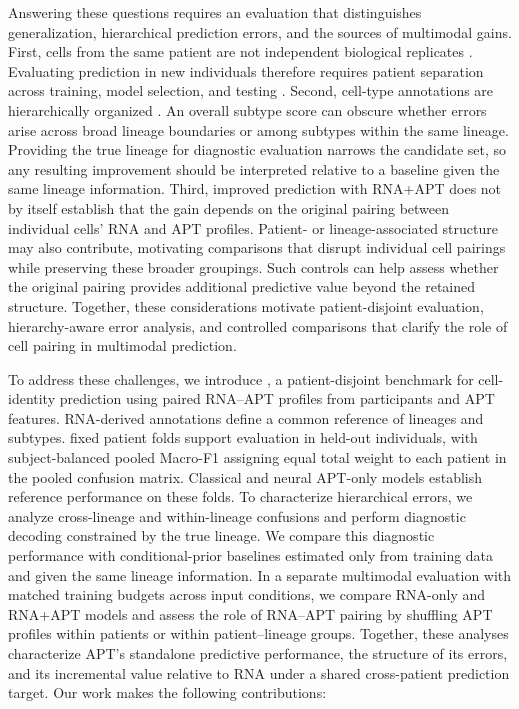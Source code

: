 Answering these questions requires an evaluation that distinguishes generalization, hierarchical prediction errors, and the sources of multimodal gains. First, cells from the same patient are not independent biological replicates \citep{zimmerman2021practical}. Evaluating prediction in new individuals therefore requires patient separation across training, model selection, and testing \citep{fischer2024sctab}. Second, cell-type annotations are hierarchically organized \citep{cultrera2026improving}. An overall subtype score can obscure whether errors arise across broad lineage boundaries or among subtypes within the same lineage. Providing the true lineage for diagnostic evaluation narrows the candidate set, so any resulting improvement should be interpreted relative to a baseline given the same lineage information. Third, improved prediction with RNA+APT does not by itself establish that the gain depends on the original pairing between individual cells’ RNA and APT profiles. Patient- or lineage-associated structure may also contribute, motivating comparisons that disrupt individual cell pairings while preserving these broader groupings. Such controls can help assess whether the original pairing provides additional predictive value beyond the retained structure. Together, these considerations motivate patient-disjoint evaluation, hierarchy-aware error analysis, and controlled comparisons that clarify the role of cell pairing in multimodal prediction.

To address these challenges, we introduce \ourbench{}, a patient-disjoint benchmark for cell-identity prediction using \numcells{} paired RNA--APT profiles from \numparticipants{} participants and \numaptfeatures{} APT features. RNA-derived annotations define a common reference of \numlineages{} lineages and \numsubtypes{} subtypes. \numfolds{} fixed patient folds support evaluation in held-out individuals, with subject-balanced pooled Macro-F1 assigning equal total weight to each patient in the pooled confusion matrix. Classical and neural APT-only models establish reference performance on these folds. To characterize hierarchical errors, we analyze cross-lineage and within-lineage confusions and perform diagnostic decoding constrained by the true lineage. We compare this diagnostic performance with conditional-prior baselines estimated only from training data and given the same lineage information. In a separate multimodal evaluation with matched training budgets across input conditions, we compare RNA-only and RNA+APT models and assess the role of RNA--APT pairing by shuffling APT profiles within patients or within patient–lineage groups. Together, these analyses characterize APT's standalone predictive performance, the structure of its errors, and its incremental value relative to RNA under a shared cross-patient prediction target. Our work makes the following contributions:

